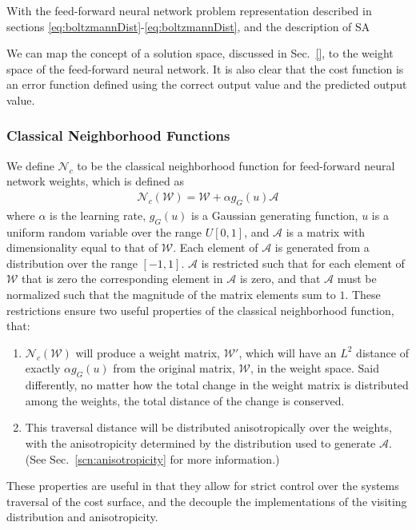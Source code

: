 \documentclass[11pt]{afthesis}
\begin{document}
	With the feed-forward neural network problem representation described in sections \ref{eq:boltzmannDist}-\ref{eq:boltzmannDist}, and the description of SA 
	
	We can map the concept of a solution space, discussed in Sec.~\ref{}, to the weight space of the feed-forward neural network. It is also clear that the cost function is an error function defined using the correct output value and the predicted output value. 
	
	
	\subsubsection{Classical Neighborhood Functions}
	\label{scn:classical_neighborhood}
	
	We define \begin{math}\mathcal{N}_{c}\end{math} to be the classical neighborhood function for feed-forward neural network weights, which is defined as \begin{align}\label{eq:classical_anisotropic_neighborhood}
	\mathcal{N}_{c} (\boldsymbol{\mathcal{W}}) = \boldsymbol{\mathcal{W}} + \alpha g_{G}(u) \boldsymbol{\mathcal{A}} 
	\end{align}
	\noindent where $\alpha$ is the learning rate, $g_{G}(u)$ is a Gaussian generating function, $u$ is a uniform random variable over the range $U[0,1]$, and $\boldsymbol{\mathcal{A}}$ is a matrix with dimensionality equal to that of $\boldsymbol{\mathcal{W}}$. Each element of $\boldsymbol{\mathcal{A}}$ is generated from a distribution over the range $[-1,1]$.  $\boldsymbol{\mathcal{A}}$ is restricted such that for each element of $\boldsymbol{\mathcal{W}}$ that is zero the corresponding element in $\boldsymbol{\mathcal{A}}$ is zero, and that $\boldsymbol{\mathcal{A}}$ must be normalized such that the magnitude of the matrix elements sum to $1$. These restrictions ensure two useful properties of the classical neighborhood function, that: 
	
	\begin{enumerate}
		\item $\mathcal{N}_{c} (\boldsymbol{\mathcal{W}})$ will produce a weight matrix, $\boldsymbol{\mathcal{W}'}$, which will have an $L^2$ distance of exactly $\alpha g_{G}(u)$ from the original matrix, $\boldsymbol{\mathcal{W}}$, in the weight space. Said differently, no matter how the total change in the weight matrix is distributed among the weights, the total distance of the change is conserved.
		\item This traversal distance will be distributed anisotropically over the weights, with the anisotropicity determined by the distribution used to generate $\boldsymbol{\mathcal{A}}$. (See Sec.~\ref{scn:anisotropicity} for more information.)
	\end{enumerate}
	These properties are useful in that they allow for strict control over the systems traversal of the cost surface, and the decouple the implementations of the visiting distribution and anisotropicity.
	
\end{document}
